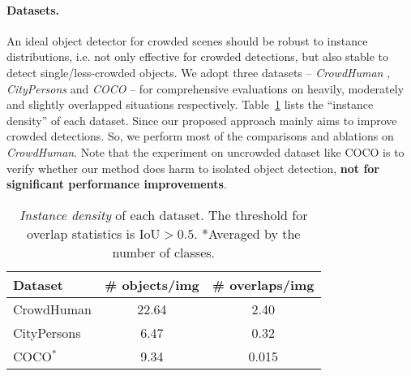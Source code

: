 \documentclass[10pt,twocolumn,letterpaper]{article}
\begin{document}
\paragraph{Datasets.}
An ideal object detector for crowded scenes should be robust to instance distributions, i.e. not only effective for crowded detections, but also stable to detect single/less-crowded objects. We adopt three datasets -- \emph{CrowdHuman} \cite{shao2018crowdhuman}, \emph{CityPersons} \cite{zhang2017citypersons} and \emph{COCO} \cite{lin2014microsoft} -- for comprehensive evaluations on heavily, moderately and slightly overlapped situations respectively. Table~\ref{tbl:datasets} lists the ``instance density'' of each dataset.  Since our proposed approach mainly aims to improve crowded detections. So, we perform most of the comparisons and ablations on \emph{CrowdHuman}. Note that the experiment on uncrowded dataset like COCO is to verify whether our method does harm to isolated object detection, \textbf{not for significant performance improvements}. 
\begin{table}[t]
   \centering
   \begin{tabular}{l|c|c}
      \toprule
      Dataset & \# objects/img & \# overlaps/img  \\
      \hline
      CrowdHuman \cite{shao2018crowdhuman} & 22.64  & 2.40 \\
      CityPersons \cite{zhang2017citypersons} & 6.47  & 0.32 \\
      COCO$^*$ \cite{lin2014microsoft} & 9.34  & 0.015 \\
      \bottomrule
   \end{tabular}
   \caption{\emph{Instance density} of each dataset.  The threshold for overlap statistics is $\mathrm{IoU} > 0.5$.  *Averaged by the number of classes.}
   \label{tbl:datasets}
\end{table} 
 
\end{document}
